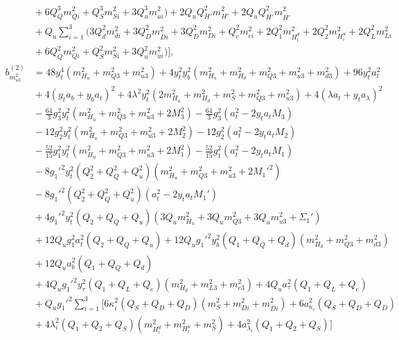 \documentclass[preprint,amsmath,amssymb,aps,superscriptaddress,prd,showpacs,floatfix,nofootinbib]{revtex4-1}
\begin{document}
\begin{subequations}
\begin{align}
&{}+6Q_Q^3m_{Qi}^2+Q_S^3m_{Si}^2+3Q_u^3m_{ui}^2\big )+2Q_uQ_{H'}^2m_{H'}^2+2Q_uQ_{\overline{H'}}^2m_{\overline{H'}}^2\nonumber\\
&{}+Q_u\sum_{i=1}^3\big ( 3Q_d^2m_{di}^2+3Q_{\overline{D}}^2m_{\overline{D}i}^2+3Q_D^2m_{Di}^2+Q_e^2m_{ei}^2+2Q_1^2m_{H_i^d}^2+2Q_2^2m_{H_i^u}^2+2Q_L^2m_{Li}^2\nonumber\\
&{}+6Q_Q^2m_{Qi}^2+Q_S^2m_{Si}^2+3Q_u^2m_{ui}^2\big )\bigg ],\label{eq:USSMmu222BetaTwoLoop}\\
b_{m_{u3}^2}^{(2)}&=48y_t^4\left ( m_{H_u}^2+m_{Q3}^2+m_{u3}^2 \right )+4y_t^2y_b^2\left ( m_{H_u}^2+m_{H_d}^2+m_{Q3}^2+m_{u3}^2+m_{d3}^2 \right )+96y_t^2a_t^2\nonumber\\
&{}+4\left ( y_ta_b+y_ba_t\right )^2+4\lambda^2y_t^2\left ( 2m_{H_u}^2+m_{H_d}^2+m_S^2+m_{Q3}^2+m_{u3}^2 \right )+4\left ( \lambda a_t+y_ta_\lambda\right )^2\nonumber\\
&{}-\frac{64}{3}g_3^2y_t^2\left ( m_{H_u}^2+m_{Q3}^2+m_{u3}^2+2M_3^2\right )-\frac{64}{3}g_3^2\left ( a_t^2-2y_ta_tM_3 \right )\nonumber\\
&{}-12g_2^2y_t^2\left ( m_{H_u}^2+m_{Q3}^2+m_{u3}^2+2M_2^2\right )-12g_2^2\left ( a_t^2-2y_ta_tM_2\right )\nonumber\\
&{}-\frac{52}{15}g_1^2y_t^2\left ( m_{H_u}^2+m_{Q3}^2+m_{u3}^2+2M_1^2\right )-\frac{52}{15}g_1^2\left ( a_t^2-2y_ta_tM_1\right )\nonumber\\
&{}-8g_1'^2y_t^2\left ( Q_2^2+Q_Q^2+Q_u^2\right )\left ( m_{H_u}^2+m_{Q3}^2+m_{u3}^2+2M_1'^2\right )\nonumber\\
&{}-8g_1'^2\left ( Q_2^2+Q_Q^2+Q_u^2\right )\left ( a_t^2-2y_ta_tM_1'\right )\nonumber\\
&{}+4g_1'^2y_t^2\left ( Q_2+Q_Q+Q_u\right )\left ( 3Q_um_{H_u}^2+3Q_um_{Q3}^2+3Q_um_{u3}^2+\Sigma_1'\right )\nonumber\\
&{}+12Q_ug_1^2a_t^2\left ( Q_2+Q_Q+Q_u\right )+12Q_ug_1'^2y_b^2\left ( Q_1+Q_Q+Q_d \right )\left ( m_{H_d}^2+m_{Q3}^2+m_{d3}^2\right )\nonumber\\
&{}+12Q_ua_b^2\left ( Q_1+Q_Q+Q_d \right )\nonumber\\
&{}+4Q_ug_1'^2y_\tau^2\left ( Q_1+Q_L+Q_e\right )\left ( m_{H_d}^2+m_{L3}^2+m_{e3}^2\right )+4Q_ua_\tau^2\left ( Q_1+Q_L+Q_e\right )\nonumber\\
&{}+Q_ug_1'^2\sum_{i=1}^3\bigg [ 6\kappa_i^2\left ( Q_S+Q_D+Q_{\overline{D}}\right )\left ( m_S^2+m_{Di}^2+m_{\overline{D}i}^2\right )+6a_{\kappa_i}^2\left ( Q_S+Q_D+Q_{\overline{D}}\right )\nonumber\\
&{}+4\lambda_i^2\left ( Q_1+Q_2+Q_S\right )\left ( m_{H_i^d}^2+m_{H_i^u}^2+m_S^2\right )+4a_{\lambda_i}^2\left ( Q_1+Q_2+Q_S\right )\bigg ]\nonumber\\

\end{align}
\end{subequations}
\end{document}
